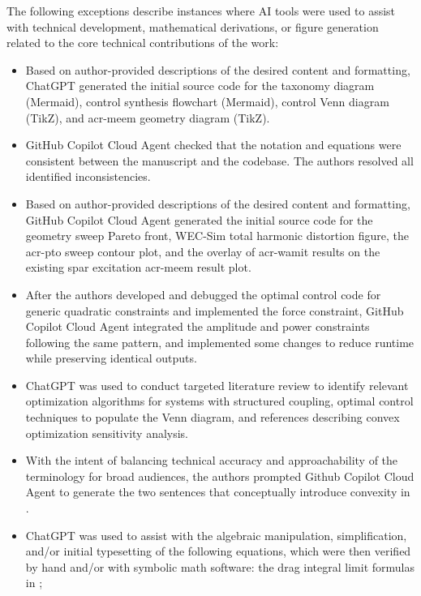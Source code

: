 \documentclass[a4paper,fleqn,colorlinks,unicode,lineno]{cas-dc} %
\begin{document}
The following exceptions describe instances where AI tools were used to assist with technical development, mathematical derivations, or figure generation related to the core technical contributions of the work:
\begin{itemize}[leftmargin=*]
\item Based on author-provided descriptions of the desired content and formatting, ChatGPT generated the initial source code for the taxonomy diagram (Mermaid), control synthesis flowchart (Mermaid), control Venn diagram (TikZ), and \gls{acr-meem} geometry diagram (TikZ).
\item GitHub Copilot Cloud Agent checked that the notation and equations were consistent between the manuscript and the codebase. The authors resolved all identified inconsistencies.
\item Based on author-provided descriptions of the desired content and formatting, GitHub Copilot Cloud Agent generated the initial source code for the geometry sweep Pareto front, WEC-Sim total harmonic distortion figure, the \gls{acr-pto} sweep contour plot, and the overlay of \gls{acr-wamit} results on the existing spar excitation \gls{acr-meem} result plot.
\item After the authors developed and debugged the optimal control code for generic quadratic constraints and implemented the force constraint, GitHub Copilot Cloud Agent integrated the amplitude and power constraints following the same pattern, and implemented some changes to reduce runtime while preserving identical outputs.
\item ChatGPT was used to conduct targeted literature review to identify relevant optimization algorithms for systems with structured coupling, optimal control techniques to populate the Venn diagram, and references describing convex optimization sensitivity analysis.
\item With the intent of balancing technical accuracy and approachability of the terminology for broad audiences, the authors prompted Github Copilot Cloud Agent to generate the two sentences that conceptually introduce convexity in .
\item ChatGPT was used to assist with the algebraic manipulation, simplification, and/or initial typesetting of the following equations, which were then verified by hand and/or with symbolic math software:
the drag integral limit formulas in ;

\end{itemize}
\end{document}
